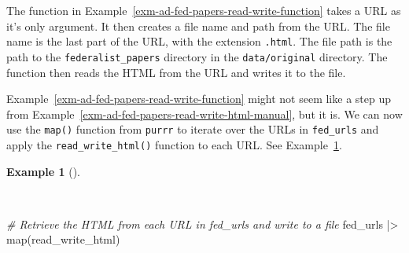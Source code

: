 \documentclass[
  letterpaper,
  DIV=11,
  numbers=noendperiod]{scrreport}
\newenvironment{Shaded}{\begin{snugshade}}{\end{snugshade}}
\newcommand{\CommentTok}[1]{\textcolor[rgb]{0.00,0.00,0.00}{\textit{#1}}}
\newcommand{\FunctionTok}[1]{\textcolor[rgb]{0.00,0.00,0.00}{#1}}
\newcommand{\NormalTok}[1]{\textcolor[rgb]{0.00,0.00,0.00}{#1}}
\newcommand{\SpecialCharTok}[1]{\textcolor[rgb]{0.00,0.00,0.00}{#1}}
\theoremstyle{definition}
\newtheorem{example}{Example}[chapter]
\theoremstyle{remark}
\begin{document}
The function in Example~\ref{exm-ad-fed-papers-read-write-function}
takes a URL as it's only argument. It then creates a file name and path
from the URL. The file name is the last part of the URL, with the
extension \texttt{.html}. The file path is the path to the
\texttt{federalist\_papers} directory in the \texttt{data/original}
directory. The function then reads the HTML from the URL and writes it
to the file.

Example~\ref{exm-ad-fed-papers-read-write-function} might not seem like
a step up from Example~\ref{exm-ad-fed-papers-read-write-html-manual},
but it is. We can now use the \texttt{map()} function from
\texttt{purrr} to iterate over the URLs in \texttt{fed\_urls} and apply
the \texttt{read\_write\_html()} function to each URL. See
Example~\ref{exm-ad-fed-papers-read-write-map}.

\begin{example}[]\protect\hypertarget{exm-ad-fed-papers-read-write-map}{}\label{exm-ad-fed-papers-read-write-map}

~

\begin{Shaded}
\begin{Highlighting}[]
\CommentTok{\# Retrieve the HTML from each URL in \textasciigrave{}fed\_urls\textasciigrave{} and write to a file}
\NormalTok{fed\_urls }\SpecialCharTok{|\textgreater{}} 
  \FunctionTok{map}\NormalTok{(read\_write\_html)}
\end{Highlighting}
\end{Shaded}

\end{example}
\end{document}
